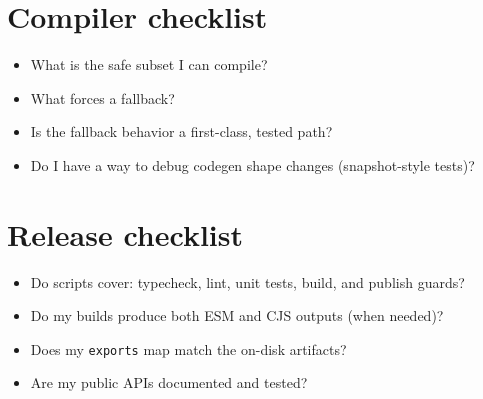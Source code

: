 \section{Compiler checklist}
\begin{itemize}
  \item What is the safe subset I can compile?
  \item What forces a fallback?
  \item Is the fallback behavior a first-class, tested path?
  \item Do I have a way to debug codegen shape changes (snapshot-style tests)?
\end{itemize}

\section{Release checklist}
\begin{itemize}
  \item Do scripts cover: typecheck, lint, unit tests, build, and publish guards?
  \item Do my builds produce both ESM and CJS outputs (when needed)?
  \item Does my \texttt{exports} map match the on-disk artifacts?
  \item Are my public APIs documented and tested?
\end{itemize}
